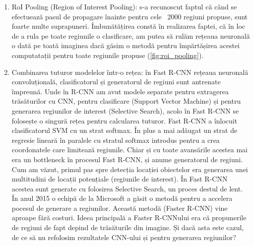 \begin{enumerate}
	\item RoI Pooling (Region of Interest Pooling): s-a recunoscut faptul că când se efectuează pasul de propagare înainte pentru cele ~2000 regiuni propuse, sunt foarte multe suprapuneri. Îmbunătățirea constă în realizarea faptei, că în loc de a rula pe toate regiunile o clasificare, am putea să rulăm rețeaua neuronală o dată pe toată imaginea dacă găsim o metodă pentru împărtășirea acestei computatații pentru toate regiunile propuse (\ref{fig:roi_pooling}).
	\item Combinarea tuturor modelelor într-o rețea: în Fast R-CNN rețeaua neuronală convoluțională, clasificatorul și generatorul de regiuni sunt antrenate împreună. Unde în R-CNN am avut modele separate pentru extragerea trăsăturilor cu CNN, pentru clasificare (Support Vector Machine) și pentru generarea regiunilor de interest (Selective Search), acolo în Fast R-CNN se folosește o singură rețea pentru calcularea tuturor. Fast R-CNN a înlocuit clasificatorul SVM cu un strat softmax. În plus a mai adăugat un strat de regresie lineară în paralele cu stratul softmax introdus pentru a crea coordonatele care limitează regiunile.\newline
Chiar și cu toate avansările acestea mai era un bottleneck în procesul Fast R-CNN, și anume generatorul de regiuni. Cum am văzut, primul pas spre detecția locației obiectelor era generarea unei multitudini de locații potențiale (regiunile de interest). În Fast R-CNN acestea sunt generate cu folosirea Selective Search, un proces destul de lent. În anul 2015 o echipă de la Microsoft a găsit o metodă pentru a accelera pocesul de generare a regiunilor. Această metodă (Faster R-CNN) vine aproape fără costuri. Ideea principală a Faster R-CNNului era că propunerile de regiuni de fapt depind de trăsăturile din imagine. Și dacă asta este cazul, de ce să nu refolosim rezultatele CNN-ului și pentru generarea regiunilor?
\end{enumerate}

